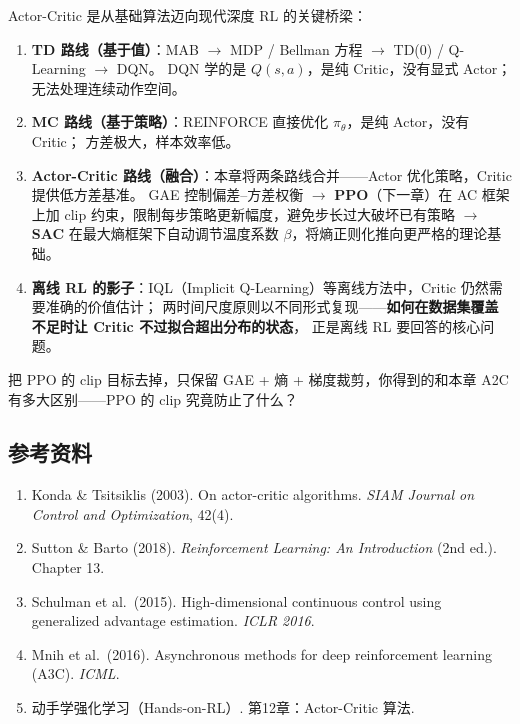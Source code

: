 \documentclass{article}
\begin{document}
Actor-Critic 是从基础算法迈向现代深度 RL 的关键桥梁：

\begin{enumerate}
  \item \textbf{TD 路线（基于值）}：MAB $\to$ MDP / Bellman 方程 $\to$ TD(0) / Q-Learning $\to$ DQN。
        DQN 学的是 $Q(s,a)$，是纯 Critic，没有显式 Actor；无法处理连续动作空间。

  \item \textbf{MC 路线（基于策略）}：REINFORCE 直接优化 $\pi_\theta$，是纯 Actor，没有 Critic；
        方差极大，样本效率低。

  \item \textbf{Actor-Critic 路线（融合）}：本章将两条路线合并——Actor 优化策略，Critic 提供低方差基准。
        GAE 控制偏差--方差权衡 $\to$
        \textbf{PPO}（下一章）在 AC 框架上加 clip 约束，限制每步策略更新幅度，避免步长过大破坏已有策略 $\to$
        \textbf{SAC} 在最大熵框架下自动调节温度系数 $\beta$，将熵正则化推向更严格的理论基础。

  \item \textbf{离线 RL 的影子}：IQL（Implicit Q-Learning）等离线方法中，Critic 仍然需要准确的价值估计；
         两时间尺度原则以不同形式复现——\textbf{如何在数据集覆盖不足时让 Critic 不过拟合超出分布的状态}，
        正是离线 RL 要回答的核心问题。
\end{enumerate}

把 PPO 的 clip 目标去掉，只保留 GAE + 熵 + 梯度裁剪，你得到的和本章 A2C 有多大区别——PPO 的 clip 究竟防止了什么？

\subsection*{参考资料}

\begin{enumerate}
  \item Konda \& Tsitsiklis (2003). On actor-critic algorithms. \textit{SIAM Journal on Control and Optimization}, 42(4).
  \item Sutton \& Barto (2018). \textit{Reinforcement Learning: An Introduction} (2nd ed.). Chapter 13.
  \item Schulman et al.\ (2015). High-dimensional continuous control using generalized advantage estimation. \textit{ICLR 2016}.
  \item Mnih et al.\ (2016). Asynchronous methods for deep reinforcement learning (A3C). \textit{ICML}.
  \item 动手学强化学习（Hands-on-RL）. 第12章：Actor-Critic 算法.
\end{enumerate}
\end{document}
